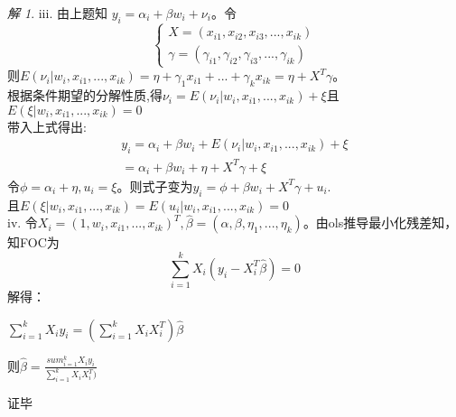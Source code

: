 \documentclass[a4paper]{ctexart}
\theoremstyle{remark}
\newtheorem*{solution}{解}
\renewcommand{\qedsymbol}{证毕}
\begin{document}
\begin{itemize}
\begin{solution}
    iii. 由上题知 $y_i = \alpha_i+\beta w_i+\nu_i$。令
    \begin{equation*}
        \begin{cases}
            X = (x_{i1}, x_{i2}, x_{i3}, ..., x_{ik})\\
            \gamma = (\gamma_{i1},\gamma_{i2}, \gamma_{i3}, ..., \gamma_{ik})
        \end{cases}
    \end{equation*}
    则$E(\nu_i|w_i, x_{i1},...,x_{ik})=\eta+\gamma_1 x_{i1}+...+\gamma_k x_{ik} = \eta + X^T\gamma$。\\
    根据条件期望的分解性质,得$\nu_i = E(\nu_i|w_i,x_{i1}, ..., x_{ik}) + \xi$且$E(\xi|w_i,x_{i1}, ..., x_{ik}) = 0$\\
    带入上式得出:
    \begin{align*}
        y_i = \alpha_i + \beta w_i + E(\nu_i|w_i,x_{i1}, ..., x_{ik}) + \xi\\
        =\alpha_i + \beta w_i + \eta + X^T\gamma +\xi
    \end{align*}
    令$\phi = \alpha_i + \eta, u_i = \xi$。则式子变为$y_i =\phi + \beta w_i + X^T\gamma + u_i$.\\且$E(\xi|w_i,x_{i1}, ..., x_{ik}) = E(u_i|w_i,x_{i1}, ..., x_{ik}) = 0$
    \\
    
    iv. 令$X_i = (1, w_i ,x_{i1}, ..., x_{ik})^T, \hat{\beta} = (\alpha, \beta, \eta_{1}, ..., \eta_{k})$。由ols推导最小化残差知，知FOC为
    \begin{equation*}
        \sum_{i=1}^{k} X_i(y_i - X_i^T\hat{\beta}) = 0       
    \end{equation*}
    解得：
    \begin{center}
     $\sum_{i=1}^{k}X_iy_i = (\sum_{i=1}^{k}X_iX_i^T)\hat{\beta}$
    \end{center}
    则$\hat{\beta} = \frac{sum_{i=1}^{k}X_iy_i}{\sum_{i=1}^{k}X_iX_i^T)}$
    
    
    
    \qedsymbol
\end{solution}


\end{itemize}
\end{document}
